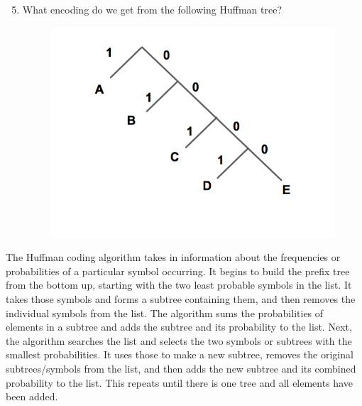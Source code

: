 \documentclass[11pt]{article}
\begin{document}
\begin{enumerate}\setcounter{enumi}{4}
	\item What encoding do we get from the following Huffman tree?
	\begin{figure}[h!]
		\centering
		\label{fig:encoding-2}
		\includegraphics[scale=0.5]{encoding-2.png}
	\end{figure}
\end{enumerate}

The Huffman coding algorithm takes in information about the frequencies or probabilities of a particular symbol occurring. It begins to build the prefix tree from the bottom up, starting with the two least probable symbols in the list. It takes those symbols and forms a subtree containing them, and then removes the individual symbols from the list. The algorithm sums the probabilities of elements in a subtree and adds the subtree and its probability to the list. Next, the algorithm searches the list and selects the two symbols or subtrees with the smallest probabilities. It uses those to make a new subtree, removes the original subtrees/symbols from the list, and then adds the new subtree and its combined probability to the list. This repeats until there is one tree and all elements have been added.
\end{document}
